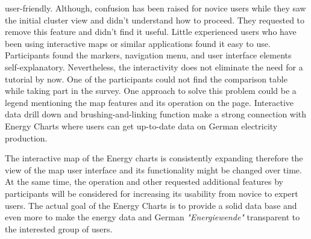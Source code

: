 user-friendly. Although, confusion has been raised for novice users while they saw the initial cluster view and didn't understand how to proceed. They requested to remove this feature and didn't find it useful. Little experienced users who have been using interactive maps or similar applications found it easy to use. Participants found the markers, navigation menu, and user interface elements self-explanatory. Nevertheless, the interactivity does not eliminate the need for a tutorial by now. One of the participants could not find the comparison table while taking part in the survey. One approach to solve this problem could be a legend mentioning the map features and its operation on the page. Interactive data drill down and brushing-and-linking function make a strong connection with Energy Charts where users can get up-to-date data on German electricity production. 

The interactive map of the Energy charts is consistently expanding therefore the view of the map user interface and its functionality might be changed over time. At the same time, the operation and other requested additional features by participants will be considered for increasing its usability from novice to expert users. The actual goal of the Energy Charts is to provide a solid data base and even more to make the energy data and German \textit{"Energiewende"} transparent to the interested group of users.  

